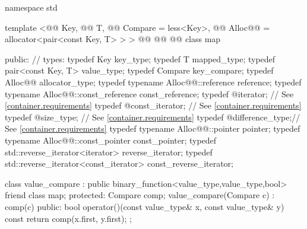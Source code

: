 \documentclass[american,twoside]{book}
\begin{document}
\begin{codeblock}
namespace std {
  template <@@ Key, @@ T, 
            @@ Compare = less<Key>,
            @@ Alloc@@ = allocator<pair<const Key, T> > >
  @@
           @@
           @@
  class map {
  public:
    // types:
    typedef Key                                   key_type;
    typedef T                                     mapped_type;
    typedef pair<const Key, T>                    value_type;
    typedef Compare                               key_compare;
    typedef Alloc@@                             allocator_type;
    typedef typename Alloc@@::reference         reference;
    typedef typename Alloc@@::const_reference   const_reference;
    typedef @\impdef@                iterator;       // See \ref{container.requirements}
    typedef @\impdef@                const_iterator; // See \ref{container.requirements}
    typedef @\impdef@                size_type;      // See \ref{container.requirements}
    typedef @\impdef@                difference_type;// See \ref{container.requirements}
    typedef typename Alloc@@::pointer           pointer;
    typedef typename Alloc@@::const_pointer     const_pointer;
    typedef std::reverse_iterator<iterator>       reverse_iterator;
    typedef std::reverse_iterator<const_iterator> const_reverse_iterator;

    class value_compare
      : public binary_function<value_type,value_type,bool> {
    friend class map;
    protected:
      Compare comp;
      value_compare(Compare c) : comp(c) {}
    public:
      bool operator()(const value_type& x, const value_type& y) const {
        return comp(x.first, y.first);
      }
    };

}}
\end{codeblock}
\end{document}
